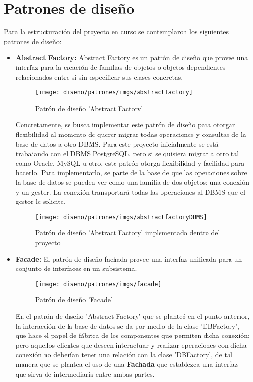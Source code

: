 \chapter{Patrones de diseño}
Para la estructuración del proyecto en curso se contemplaron los siguientes patrones de diseño:
\leavevmode
\linebreak
\begin{itemize}
	\item{\textbf{Abstract Factory:} Abstract Factory es un patrón de diseño que provee una interfaz para la creación de familias de objetos o objetos dependientes relacionados entre sí sin especificar sus clases concretas.
	\begin{figure}[h!]
	\centering
		\texttt{[image: diseno/patrones/imgs/abstractfactory]}
		\caption{Patrón de diseño 'Abstract Factory'}
	\end{figure}
	Concretamente, se busca implementar este patrón de diseño para otorgar flexibilidad al momento de querer migrar todas operaciones y consultas de la base de datos a otro DBMS. Para este proyecto inicialmente se está trabajando con el DBMS PostgreSQL, pero si se quisiera migrar a otro tal como Oracle, MySQL u otro, este patrón otorga flexibilidad y facilidad para hacerlo. Para implementarlo, se parte de la base de que las operaciones sobre la base de datos se pueden ver como una familia de dos objetos: una conexión y un gestor. La conexión transportará todas las operaciones al DBMS que el gestor le solicite.
	\begin{figure}[h!]
	\centering
		\texttt{[image: diseno/patrones/imgs/abstractfactoryDBMS]}
		\caption{Patrón de diseño 'Abstract Factory' implementado dentro del proyecto}
	\end{figure}}
	\item{\textbf{Facade:} El patrón de diseño fachada provee una interfaz unificada para un conjunto de interfaces en un subsistema.
	\begin{figure}[h!]
	\centering
		\texttt{[image: diseno/patrones/imgs/facade]}
		\caption{Patrón de diseño 'Facade'}
	\end{figure}	
	En el patrón de diseño 'Abstract Factory' que se planteó en el punto anterior, la interacción de la base de datos se da por medio de la clase 'DBFactory', que hace el papel de fábrica de los componentes que permiten dicha conexión; pero aquellos clientes que deseen interactuar y realizar operaciones con dicha conexión no deberían tener una relación con la clase 'DBFactory', de tal manera que se plantea el uso de una \textbf{Fachada} que establezca una interfaz que sirva de intermediaria entre ambas partes.
}
\end{itemize}
